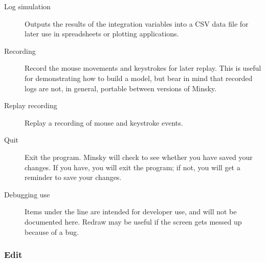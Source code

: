 \begin{description}
\item[Log simulation] Outputs the results of the integration variables
into a CSV data file for later use in spreadsheets or plotting
applications.

\item[Recording] Record the mouse movements and keystrokes for later
replay. This is useful for demonstrating how to build a model, but
bear in mind that recorded logs are not, in general, portable between
versions of Minsky.

\item[Replay recording] Replay a recording of mouse and keystroke events.

\item[Quit] Exit the program. Minsky will check to see whether you have saved your changes. If you have, you will exit the program; if not, you will get a reminder to save your changes.

\item[Debugging use] Items under the line are intended for developer
  use, and will not be documented here. Redraw may be useful if the
  screen gets messed up because of a bug.

\end{description}

\subsubsection{Edit}
\label{Edit}

